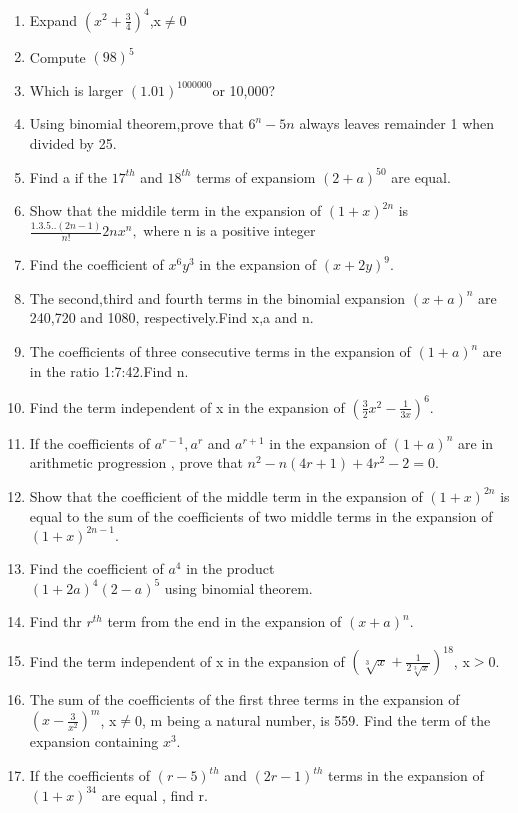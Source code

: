 \renewcommand{\theequation}{\theenumi}
\begin{enumerate}[label=\arabic*.,ref=\thesubsection.\theenumi]

\item Expand $(x^2+\frac{3}{4})^4$,x$\neq0$\\
\item Compute $(98)^5$\\
\item Which is larger $(1.01)^{1000000}$or 10,000?\\
\item Using binomial theorem,prove that $6^n-5n$ always leaves remainder 1 when divided by 25.\\
\item Find a if the $17^{th}$ and $18^{th}$ terms of expansiom $(2+a)^{50}$ are equal.\\
\item Show that the middile term in the expansion of $(1+x)^{2n} $ is  $\frac{1.3.5..(2n-1)}{n!}2n x^n,$ where n is a positive integer\\
\item Find the coefficient of $x^6y^3$ in the expansion of $(x+2y)^9$.
\item The second,third and fourth terms in the binomial expansion $(x+a)^n$ are 240,720 and 1080, respectively.Find x,a and n.\\
\item The coefficients of three consecutive terms in the expansion of $(1+a)^n$ are in the ratio 1:7:42.Find n.\\
\item Find the term independent of x in the expansion of $(\frac{3}{2}x^2 - \frac{1}{3x})^6$.\\
\item If the coefficients of $a^{r-1},a^r$ and $a^{r+1}$ in the expansion of $(1+a)^n$ are in arithmetic progression , prove that $n^2 - n(4r+1) + 4r^2 - 2 = 0$.\\
\item Show that the coefficient of the middle term in the expansion of $(1+x)^{2n}$ is equal to the sum of the coefficients of two middle terms in the expansion of $(1+x)^{2n-1}.$\\
\item Find the coefficient of $a^4$ in the product\\ $(1+2a)^4(2-a)^5$ using binomial theorem.\\
\item Find thr $r^{th}$ term from the end in the expansion of $(x+a)^n.$\\
\item Find the term independent of x in the expansion of $(\sqrt[3]{x} + \frac{1}{2\sqrt[3]{x}})^{18}$, x$>$0.\\
\item The sum of the coefficients of the first three terms in the expansion of $(x - \frac{3}{x^2})^m$, x$\neq$0, m being a natural number, is 559. Find the term of the expansion containing $x^3$.\\	
\item If the coefficients of $(r-5)^{th}$ and  $(2r-1)^{th}$ terms in the expansion of $(1+x)^{34}$ are equal , find r.
\end{enumerate}
%
